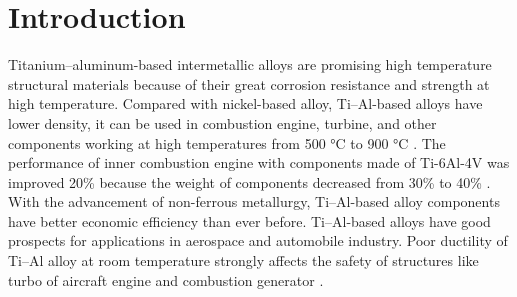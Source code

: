 \documentclass[materials,article,accept,moreauthors,pdftex,10pt,a4paper]{Definitions/mdpi}
\begin{document}
\section{Introduction}
Titanium--aluminum-based intermetallic alloys are promising high temperature structural materials because of their great corrosion resistance and strength at high temperature. Compared with nickel-based alloy,  Ti--Al-based alloys have lower density, it can be used in combustion engine, turbine, and other components working at high temperatures from 500 \si{\degreeCelsius} to 900 \si{\degreeCelsius} \cite{Clemens2016}. The performance of inner combustion engine with components made of Ti-6Al-4V was improved  20\% because the weight of components decreased from 30\% to 40\% \cite{Bewlay2016}. With the advancement of non-ferrous metallurgy, Ti--Al-based alloy components have better economic efficiency than ever before. Ti--Al-based alloys have good prospects for applications in aerospace and automobile industry.
Poor ductility of Ti--Al alloy  at room temperature strongly affects the safety of structures like turbo of aircraft engine and combustion generator \cite{Munz2017}.
\end{document}
